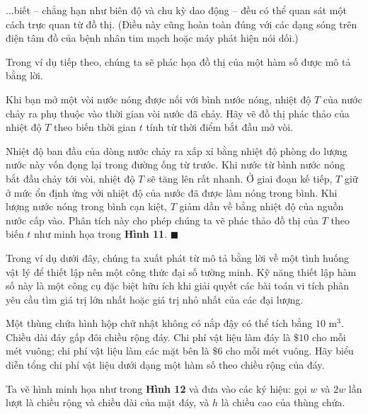 \documentclass[10pt,letterpaper]{article}
\begin{document}
\begin{minipage}[t]{0.71\textwidth}
    ...biết -- chẳng hạn như biên độ và chu kỳ dao động -- đều có thể quan sát một cách trực quan từ đồ thị. (Điều này cũng hoàn toàn đúng với các dạng sóng trên điện tâm đồ của bệnh nhân tim mạch hoặc máy phát hiện nói dối.)

    Trong ví dụ tiếp theo, chúng ta sẽ phác họa đồ thị của một hàm số được mô tả bằng lời.

    \vspace{0.25cm}
    \quad Khi bạn mở một vòi nước nóng được nối với bình nước nóng, nhiệt độ $T$ của nước chảy ra phụ thuộc vào thời gian vòi nước đã chảy. Hãy vẽ đồ thị phác thảo của nhiệt độ $T$ theo biến thời gian $t$ tính từ thời điểm bắt đầu mở vòi.

    \vspace{0.15cm}
    \quad Nhiệt độ ban đầu của dòng nước chảy ra xấp xỉ bằng nhiệt độ phòng do lượng nước này vốn đọng lại trong đường ống từ trước. Khi nước từ bình nước nóng bắt đầu chảy tới vòi, nhiệt độ $T$ sẽ tăng lên rất nhanh. Ở giai đoạn kế tiếp, $T$ giữ ở mức ổn định ứng với nhiệt độ của nước đã được làm nóng trong bình. Khi lượng nước nóng trong bình cạn kiệt, $T$ giảm dần về bằng nhiệt độ của nguồn nước cấp vào. Phân tích này cho phép chúng ta vẽ phác thảo đồ thị của $T$ theo biến $t$ như minh họa trong \textbf{Hình 11}. \hfill {\color{stewartcyan}$\blacksquare$}

    \vspace{0.3cm}
    Trong ví dụ dưới đây, chúng ta xuất phát từ mô tả bằng lời về một tình huống vật lý để thiết lập nên một công thức đại số tường minh. Kỹ năng thiết lập hàm số này là một công cụ đặc biệt hữu ích khi giải quyết các bài toán vi tích phân yêu cầu tìm giá trị lớn nhất hoặc giá trị nhỏ nhất của các đại lượng.

    \vspace{0.25cm}
    \quad Một thùng chứa hình hộp chữ nhật không có nắp đậy có thể tích bằng $10\text{ m}^3$. Chiều dài đáy gấp đôi chiều rộng đáy. Chi phí vật liệu làm đáy là $\$10$ cho mỗi mét vuông; chi phí vật liệu làm các mặt bên là $\$6$ cho mỗi mét vuông. Hãy biểu diễn tổng chi phí vật liệu dưới dạng một hàm số theo chiều rộng của đáy.

    \vspace{0.15cm}
    \quad Ta vẽ hình minh họa như trong \textbf{Hình 12} và đưa vào các ký hiệu: gọi $w$ và $2w$ lần lượt là chiều rộng và chiều dài của mặt đáy, và $h$ là chiều cao của thùng chứa.


\end{minipage}
\end{document}
